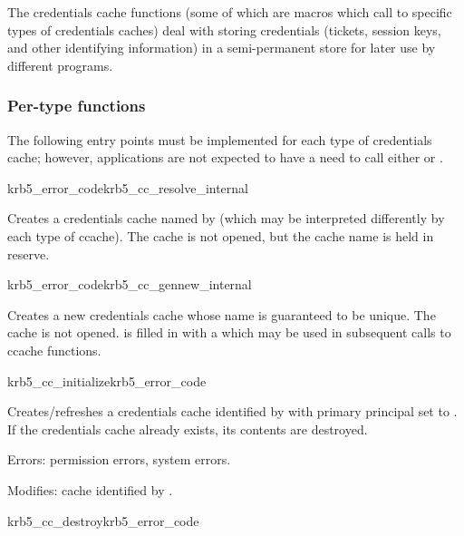 The credentials cache functions (some of which are macros which call to
specific types of credentials caches) deal with storing credentials
(tickets, session keys, and other identifying information) in a
semi-permanent store for later use by different programs.

\subsubsection{Per-type functions}
The following entry points must be implemented for each type of
credentials cache; however, applications are not expected to have a need
to call either  or
.


\begin{funcdecl}{krb5_error_code}{krb5_cc_resolve_internal}{\funcout}
\funcin
{}
\end{funcdecl}

Creates a credentials cache named by  (which may be
interpreted differently by each type of ccache).  The cache is not
opened, but the cache name is held in reserve.

\begin{funcdecl}{krb5_error_code}{krb5_cc_gennew_internal}{\funcout}
\end{funcdecl}

Creates a new credentials cache whose name is guaranteed to be
unique.  The cache is not opened.  is
filled in with a  which may be used in subsequent
calls to ccache functions.

\begin{funcdecl}{krb5_cc_initialize}{krb5_error_code}{\funcinout}
\funcin
{}
\end{funcdecl}

Creates/refreshes a credentials cache identified by  with
primary principal set to .
If the credentials cache already exists, its contents are destroyed.

Errors:  permission errors, system errors.

Modifies: cache identified by .

\begin{funcdecl}{krb5_cc_destroy}{krb5_error_code}{\funcin}
\end{funcdecl}

